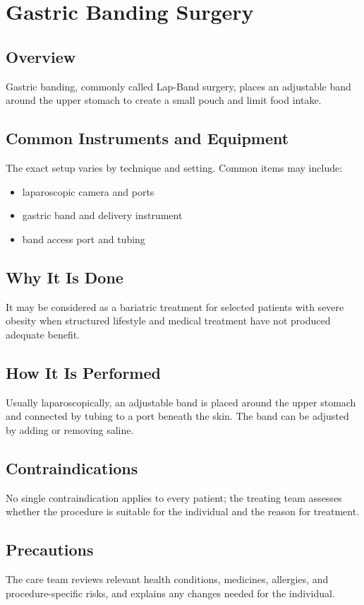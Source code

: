 \chapter{Gastric Banding Surgery}

\section*{Overview}
Gastric banding, commonly called Lap-Band surgery, places an adjustable band around the upper stomach to create a small pouch and limit food intake.

\section*{Common Instruments and Equipment}
The exact setup varies by technique and setting. Common items may include:
\begin{itemize}[nosep,leftmargin=*]
  \item laparoscopic camera and ports
  \item gastric band and delivery instrument
  \item band access port and tubing
\end{itemize}

\section*{Why It Is Done}
It may be considered as a bariatric treatment for selected patients with severe obesity when structured lifestyle and medical treatment have not produced adequate benefit.

\section*{How It Is Performed}
Usually laparoscopically, an adjustable band is placed around the upper stomach and connected by tubing to a port beneath the skin. The band can be adjusted by adding or removing saline.

\section*{Contraindications}
No single contraindication applies to every patient; the treating team assesses whether the procedure is suitable for the individual and the reason for treatment.

\section*{Precautions}
The care team reviews relevant health conditions, medicines, allergies, and procedure-specific risks, and explains any changes needed for the individual.

